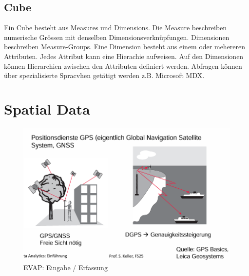 \documentclass[../Main.tex]{subfiles}
\begin{document}
\subsection{Cube}
Ein Cube besteht aus Measures und Dimensions. Die Measure beschreiben numerische Grössen mit denselben Dimensionsverknüpfungen.
Dimensionen beschreiben Measure-Groups. Eine Dimension besteht aus einem oder mehereren Attributen.
Jedes Attribut kann eine Hierachie aufweisen. Auf den Dimensionen können Hierarchien zwischen den Attributen definiert werden.
Abfragen können über spezialisierte Spracvhen getätigt werden z.B. Microsoft MDX.

\section{Spatial Data}

\begin{figure}[H]
    \centering
    \includegraphics[width=0.75\linewidth]{Images/evap-eingabe.png}
    \caption{EVAP: Eingabe / Erfassung}
\end{figure}
\end{document}
